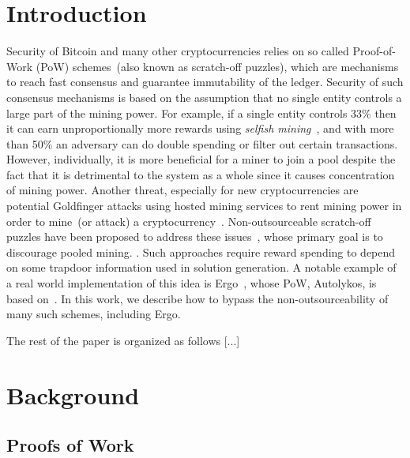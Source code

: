 \documentclass[11pt]{article}
\newcommand{\authnote}[2]{\marginpar{\parbox{\marginparwidth}{\tiny %
  \textsf{#1 {\textcolor{blue}{notes: #2}}}}}%
  \textcolor{blue}{\textbf{\dag}}}
\newcommand{\authnote}[2]{
  \textsf{#1 \textcolor{blue}{: #2}}}
\newcommand{\authnote}[2]{}
\newcommand{\knote}[1]{{\authnote{\textcolor{green}{kushti notes}}{#1}}}
\newcommand{\powname}{Autolykos\xspace}
\begin{document}
\section{Introduction}

Security of Bitcoin and many other cryptocurrencies relies on so called Proof-of-Work (PoW) schemes~(also known as scratch-off puzzles), which are mechanisms to reach fast consensus and guarantee immutability of the ledger. Security of such consensus mechanisms is based on the assumption that no single entity controls a large part of the mining power. For example, if a single entity controls
33\% then it can earn unproportionally more rewards using {\em selfish mining}~\cite{selfish}, and with more than 50\% an adversary can do double spending or filter out certain transactions. However,  individually, it is more beneficial for a miner to join a pool despite the fact that it is detrimental to the system as a whole since it causes concentration of mining power. Another threat, especially for new cryptocurrencies are potential Goldfinger attacks using hosted mining services to rent mining power in order to mine~(or attack) a cryptocurrency~\cite{goldfinger}. Non-outsourceable scratch-off puzzles have been proposed to address these issues~\cite{miller2015nonoutsourceable,daian2017short}, whose primary goal is to discourage pooled mining. \knote{links}. Such approaches require reward spending to depend on some trapdoor information used in solution generation. A notable example of a real world implementation of this idea is Ergo~\cite{ergo}, whose PoW, \powname, is based on~\cite{daian2017short}. In this work, we describe how to bypass the non-outsourceability of many such schemes, including Ergo. 

The rest of the paper is organized as follows [...]
\section{Background}

\subsection{Proofs of Work} 
\end{document}
